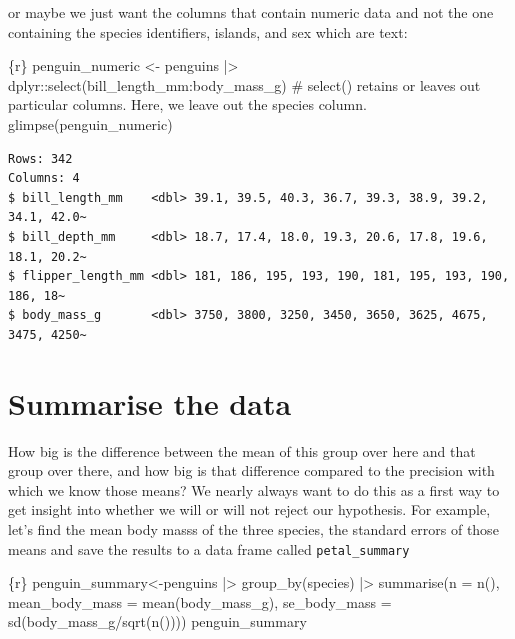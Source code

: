 \documentclass[
  letterpaper,
  DIV=11,
  numbers=noendperiod]{scrreprt}
\newenvironment{Shaded}{\begin{snugshade}}{\end{snugshade}}
\newcommand{\InformationTok}[1]{\textcolor[rgb]{0.37,0.37,0.37}{#1}}
\begin{document}
or maybe we just want the columns that contain numeric data and not the
one containing the species identifiers, islands, and sex which are text:

\begin{Shaded}
\begin{Highlighting}[]
\InformationTok{\textasciigrave{}\textasciigrave{}\textasciigrave{}\{r\}}
\InformationTok{penguin\_numeric \textless{}{-} penguins |\textgreater{}}
\InformationTok{  dplyr::select(bill\_length\_mm:body\_mass\_g) \# select() retains or leaves out particular columns. Here, we leave out the species column.}
\InformationTok{glimpse(penguin\_numeric)}
\InformationTok{\textasciigrave{}\textasciigrave{}\textasciigrave{}}
\end{Highlighting}
\end{Shaded}

\begin{verbatim}
Rows: 342
Columns: 4
$ bill_length_mm    <dbl> 39.1, 39.5, 40.3, 36.7, 39.3, 38.9, 39.2, 34.1, 42.0~
$ bill_depth_mm     <dbl> 18.7, 17.4, 18.0, 19.3, 20.6, 17.8, 19.6, 18.1, 20.2~
$ flipper_length_mm <dbl> 181, 186, 195, 193, 190, 181, 195, 193, 190, 186, 18~
$ body_mass_g       <dbl> 3750, 3800, 3250, 3450, 3650, 3625, 4675, 3475, 4250~
\end{verbatim}

\section{Summarise the data}\label{summarise-the-data}

How big is the difference between the mean of this group over here and
that group over there, and how big is that difference compared to the
precision with which we know those means? We nearly always want to do
this as a first way to get insight into whether we will or will not
reject our hypothesis. For example, let's find the mean body masss of
the three species, the standard errors of those means and save the
results to a data frame called \texttt{petal\_summary}

\begin{Shaded}
\begin{Highlighting}[]
\InformationTok{\textasciigrave{}\textasciigrave{}\textasciigrave{}\{r\}}
\InformationTok{penguin\_summary\textless{}{-}penguins |\textgreater{}}
\InformationTok{  group\_by(species) |\textgreater{}}
\InformationTok{  summarise(n = n(),}
\InformationTok{            mean\_body\_mass = mean(body\_mass\_g),}
\InformationTok{            se\_body\_mass = sd(body\_mass\_g/sqrt(n())))}
\InformationTok{penguin\_summary}
\InformationTok{\textasciigrave{}\textasciigrave{}\textasciigrave{}}
\end{Highlighting}
\end{Shaded}
\end{document}
